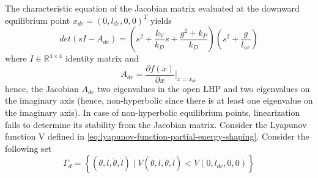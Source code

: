 \documentclass[main.tex]{subfiles}
\begin{document}
The characteristic equation of the Jacobian matrix evaluated
at the downward equilibrium point $x_{de} = (0, l_{de}, 0, 0)^T$ yields
\begin{equation}
  det(sI-A_{de}) = \left( s^2 + \frac{k_V}{k_D}s +
    \frac{g^2+k_P}{k_D} \right) \left( s^2 + \frac{g}{l_{ue}}
    \right)
\end{equation}
where $I \in \mathbb{R}^{4 \times 4}$ identity matrix and
\begin{equation}
  A_{de} = \frac{\partial f(x)}{\partial x} \bigg\rvert_{x=x_{de}}
\end{equation}
hence, the Jacobian $A_{de}$ two eigenvalues in the open LHP and two
eigenvalues on the imaginary axis (hence, non-hyperbolic since there
is at least one eigenvalue on the imaginary axis). In case of
non-hyperbolic equilibrium points, linearization fails to determine
its stability from the Jacobian matrix. Consider the Lyapunov
function V defined in
\eqref{eq:lyapunov-function-partial-energy-shaping}.
Consider the following set
\begin{equation}
  \label{eq:Gamma-d-invariant-set}
  \Gamma_d = \left\{ (\theta, l, \dot{\theta}, \dot{l})
    \mid V(\theta, l, \dot{\theta}, \dot{l}) <
    V(0, l_{de}, 0, 0) \right\}
\end{equation}
\end{document}

